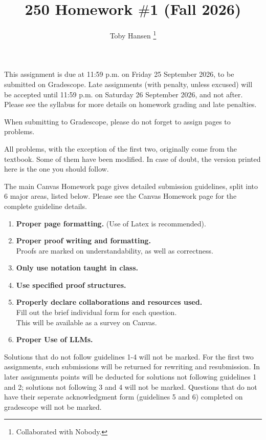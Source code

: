 \documentclass[12pt]{article}
\title{250 Homework $\#$1 (Fall 2026)}
\author{Toby Hansen \footnote{Collaborated with Nobody.}}
\begin{document}
	\date{}
	\maketitle
	This assignment is due at 11:59 p.m. on Friday 25 September 2026, to be submitted
	on Gradescope. Late assignments (with penalty, unless excused) will be accepted
	until 11:59 p.m. on Saturday 26 September 2026, and not after. Please see the
	syllabus for more details on homework grading and late penalties.

	\medskip

	When submitting to Gradescope, please do not forget to assign pages to
	problems.

	\medskip

	All problems, with the exception of the first two, originally come from the textbook.
	Some of them have been modified. In case of doubt, the version printed here is
	the one you should follow.

	\bigskip

	The main Canvas Homework page gives detailed submission guidelines, split into
	6 major areas, listed below. Please see the Canvas Homework page for the
	complete guideline details.

	\begin{enumerate}
		\item {\bf Proper page formatting.} (Use of Latex is recommended).

		\item {\bf Proper proof writing and formatting.}\\
			Proofs are marked on understandability, as well as correctness.

		\item {\bf Only use notation taught in class.}

		\item {\bf Use specified proof structures. }

		\item {\bf Properly declare collaborations and resources used.}\\
			Fill out the brief individual form for each question.\\
			This will be available as a survey on Canvas.

		\item {\bf Proper Use of LLMs.}
	\end{enumerate}

	Solutions that do not follow guidelines 1-4 will not be marked. For the first
	two assignments, such submissions will be returned for rewriting and resubmission.
	In later assignments points will be deducted for solutions not following
	guidelines 1 and 2; solutions not following 3 and 4 will not be marked.
	Questions that do not have their seperate acknowledgment form (guidelines 5 and
	6) completed on gradescope will not be marked.
\end{document}
